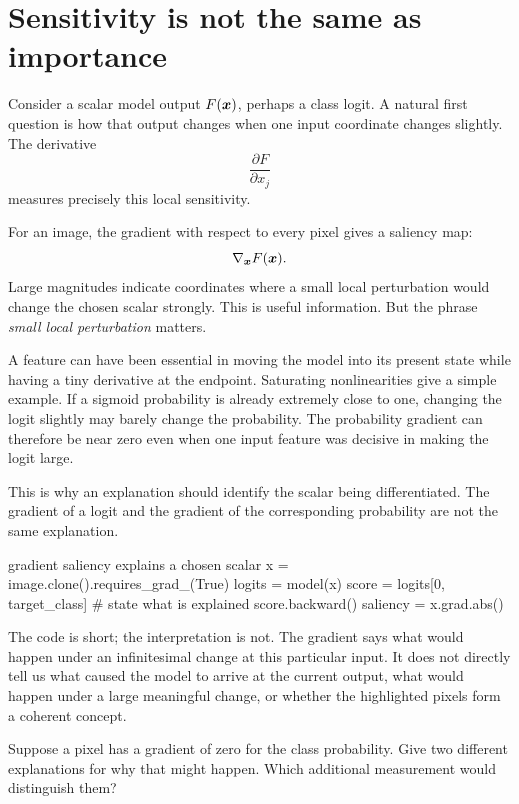 \section{Sensitivity is not the same as importance}

Consider a scalar model output \(F(\bm{x})\), perhaps a class logit. A natural first question is how that output changes when one input coordinate changes slightly. The derivative
\[
  \frac{\partial F}{\partial x_j}
\]
measures precisely this local sensitivity.

For an image, the gradient with respect to every pixel gives a saliency map:
\[
  \nabla_{\bm{x}}F(\bm{x}).
\]
Large magnitudes indicate coordinates where a small local perturbation would change the chosen scalar strongly. This is useful information. But the phrase \emph{small local perturbation} matters.

A feature can have been essential in moving the model into its present state while having a tiny derivative at the endpoint. Saturating nonlinearities give a simple example. If a sigmoid probability is already extremely close to one, changing the logit slightly may barely change the probability. The probability gradient can therefore be near zero even when one input feature was decisive in making the logit large.

This is why an explanation should identify the scalar being differentiated. The gradient of a logit and the gradient of the corresponding probability are not the same explanation.

\begin{pytorchbox}{gradient saliency explains a chosen scalar}
x = image.clone().requires_grad_(True)
logits = model(x)
score = logits[0, target_class]      # state what is explained
score.backward()
saliency = x.grad.abs()
\end{pytorchbox}

The code is short; the interpretation is not. The gradient says what would happen under an infinitesimal change at this particular input. It does not directly tell us what caused the model to arrive at the current output, what would happen under a large meaningful change, or whether the highlighted pixels form a coherent concept.

\begin{checkpointbox}
Suppose a pixel has a gradient of zero for the class probability. Give two different explanations for why that might happen. Which additional measurement would distinguish them?
\end{checkpointbox}

